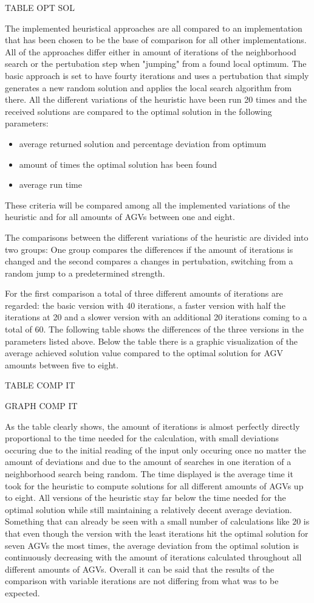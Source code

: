 TABLE OPT SOL

The implemented heuristical approaches are all compared to an implementation that has been chosen to be the base of comparison for all other implementations. All of the approaches differ either in amount of iterations of the neighborhood search or the pertubation step when "jumping" from a found local optimum. The basic approach is set to have fourty iterations and uses a pertubation that simply generates a new random solution and applies the local search algorithm from there. All the different variations of the heuristic have been run 20 times and the received solutions are compared to the optimal solution in the following parameters:
\begin{itemize}
\item average returned solution and percentage deviation from optimum
\item amount of times the optimal solution has been found
\item average run time
\end{itemize}
These criteria will be compared among all the implemented variations of the heuristic and for all amounts of AGVs between one and eight.

The comparisons between the different variations of the heuristic are divided into two groups: One group compares the differences if the amount of iterations is changed and the second compares a changes in pertubation, switching from a random jump to a predetermined strength.

For the first comparison a total of three different amounts of iterations are regarded: the basic version with 40 iterations, a faster version with half the iterations at 20 and a slower version with an additional 20 iterations coming to a total of 60. The following table shows the differences of the three versions in the parameters listed above. Below the table there is a graphic visualization of the average achieved solution value compared to the optimal solution for AGV amounts between five to eight.

TABLE COMP IT

GRAPH COMP IT

As the table clearly shows, the amount of iterations is almost perfectly directly proportional to the time needed for the calculation, with small deviations occuring due to the initial reading of the input only occuring once no matter the amount of deviations and due to the amount of searches in one iteration of a neighborhood search being random. The time displayed is the average time it took for the heuristic to compute solutions for all different amounts of AGVs up to eight. All versions of the heuristic stay far below the time needed for the optimal solution while still maintaining a relatively decent average deviation. Something that can already be seen with a small number of calculations like 20 is that even though the version with the least iterations hit the optimal solution for seven AGVs the most times, the average deviation from the optimal solution is continuously decreasing with the amount of iterations calculated throughout all different amounts of AGVs. Overall it can be said that the results of the comparison with variable iterations are not differing from what was to be expected.

